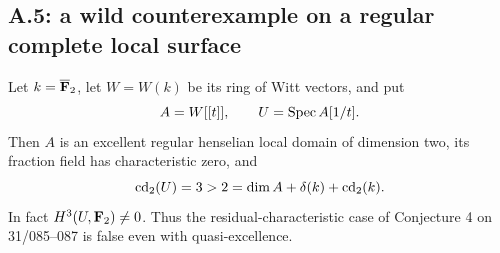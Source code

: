 \subsection{A.5: a wild counterexample on a regular complete local surface}

\begin{theorem}
\label{A:wild-affine-counterexample}
Let $k=\overline{\mathbf F}_2$, let $W=W(k)$ be its ring of Witt vectors, and put
\[
 A=W[[t]],\qquad U=\operatorname{Spec} A[1/t].
\]
Then $A$ is an excellent regular henselian local domain of dimension two,
its fraction field has characteristic zero, and
\[
 \operatorname{cd}_2(U)=3>2=\dim A+\delta(k)+\operatorname{cd}_2(k).
\]
In fact $H^3(U,\mathbf F_2)\neq0$. Thus the residual-characteristic case of
Conjecture 4 on 31/085--087 is false even with quasi-excellence.
\end{theorem}

